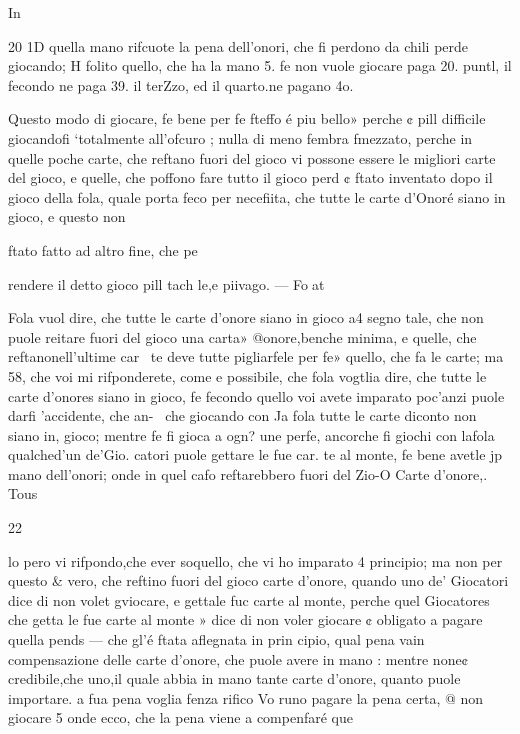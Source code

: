 \documentclass[11pt,a6paper]{article}
\begin{document}
In
 

 

20
1D quella mano rifcuote la pena
dell’onori, che fi perdono da
chili perde giocando; H folito
quello, che ha la mano 5. fe non
vuole giocare paga 20. puntl, il
fecondo ne paga 39. il terZzo, ed
il quarto.ne pagano 4o.

Questo modo di giocare, fe
bene per fe fteffo é piu bello»
perche ¢ pill difficile giocandofi
‘totalmente all’ofcuro ; nulla di
meno fembra fmezzato, perche
in quelle poche carte, che reftano fuori del gioco vi possone
essere le migliori carte del gioco, e quelle, che poffono fare
tutto il gioco perd ¢ ftato inventato dopo il gioco della fola, quale porta feco per necefiita, che tutte le carte d’Onoré
siano in gioco, e questo non

ftato fatto ad altro fine, che pe

rendere il detto gioco pill tach
le,e piivago. — Foat

Fola vuol dire, che tutte le
carte d’onore siano in gioco a4
segno tale, che non puole reitare fuori del gioco una carta»
@onore,benche minima, e quelle, che reftanonell’ultime car~
te deve tutte pigliarfele per fe»
quello, che fa le carte; ma 58,
che voi mi rifponderete, come
e possibile, che fola vogtlia dire, che tutte le carte d’onores
siano in gioco, fe fecondo quello voi avete imparato poc’anzi
puole darfi ’accidente, che an-~
che giocando con Ja fola tutte
le carte diconto non siano in,
gioco; mentre fe fi gioca a ogn?
une perfe, ancorche fi giochi
con lafola qualched’un de’Gio.
catori puole gettare le fue car.
te al monte, fe bene avetle jp
mano dell’onori; onde in quel
cafo reftarebbero fuori del Zio-O Carte d’onore,. Tous

 
 

 

 

 

 

 

 

22

lo pero vi rifpondo,che ever
soquello, che vi ho imparato 4
principio; ma non per questo &
vero, che reftino fuori del gioco carte d’onore, quando uno
de’ Giocatori dice di non volet
gviocare, e gettale fuc carte al
monte, perche quel Giocatores
che getta le fue carte al monte »
dice di non voler giocare ¢
obligato a pagare quella pends —
che gl’é ftata aflegnata in prin
cipio, qual pena vain compensazione delle carte d’onore, che
puole avere in mano : mentre
none¢ credibile,che uno,il quale
abbia in mano tante carte d’onore, quanto puole importare. a
fua pena voglia fenza rifico Vo
runo pagare la pena certa, @
non giocare 5 onde ecco, che la
pena viene a compenfaré que
\end{document}
